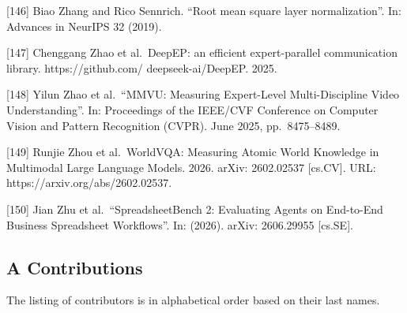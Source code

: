 \documentclass[
  10
]{article}
\begin{document}
{[}146{]} Biao Zhang and Rico Sennrich. ``Root mean square layer
normalization''. In: Advances in NeurIPS 32 (2019).

{[}147{]} Chenggang Zhao et al.~DeepEP: an efficient expert-parallel
communication library. https://github.com/ deepseek-ai/DeepEP. 2025.

{[}148{]} Yilun Zhao et al.~``MMVU: Measuring Expert-Level
Multi-Discipline Video Understanding''. In: Proceedings of the IEEE/CVF
Conference on Computer Vision and Pattern Recognition (CVPR). June 2025,
pp.~8475--8489.

{[}149{]} Runjie Zhou et al.~WorldVQA: Measuring Atomic World Knowledge
in Multimodal Large Language Models. 2026. arXiv: 2602.02537
{[}cs.CV{]}. URL: https://arxiv.org/abs/2602.02537.

{[}150{]} Jian Zhu et al.~``SpreadsheetBench 2: Evaluating Agents on
End-to-End Business Spreadsheet Workflows''. In: (2026). arXiv:
2606.29955 {[}cs.SE{]}.

\subsection{A Contributions}\label{a-contributions}

The listing of contributors is in alphabetical order based on their last
names.
\end{document}

